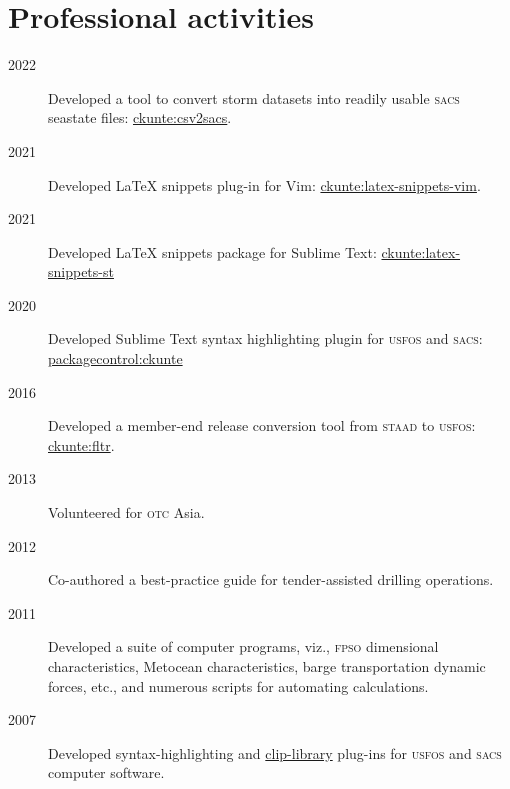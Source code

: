 \section*{Professional activities} %
\label{sec:prof_activities}

\begin{description}
\item[2022]Developed a tool to convert storm datasets into readily usable \textsc{sacs} seastate files: \href{https://github.com/ckunte/csv2sacs}{ckunte:csv2sacs}.

\item[2021]Developed {\LaTeX} snippets plug-in for Vim: \href{https://github.com/ckunte/latex-snippets-vim}{ckunte:latex-snippets-vim}.

\item[2021]Developed {\LaTeX} snippets package for Sublime Text: \href{https://github.com/ckunte/latex-snippets-st}{ckunte:latex-snippets-st}

\item[2020]Developed Sublime Text syntax highlighting plugin for \textsc{usfos} and \textsc{sacs}: \href{https://packagecontrol.io/browse/authors/ckunte}{packagecontrol:ckunte}

\item[2016]Developed a member-end release conversion tool from \textsc{staad} to \textsc{usfos}: \href{https://gist.github.com/ckunte/98fc79713b8d111b0aa6fec792b194b3}{ckunte:fltr}.

\item[2013]Volunteered for \textsc{otc} Asia.

\item[2012]Co-authored a best-practice guide for tender-assisted drilling operations.

\item[2011]Developed a suite of computer programs, viz., \textsc{fpso} dimensional characteristics, Metocean characteristics, barge transportation dynamic forces, etc., and numerous scripts for automating calculations.


\item[2007]Developed syntax-highlighting and \href{https://www.textpad.com/addons/cliplibs}{clip-library} plug-ins for \textsc{usfos} and \textsc{sacs} computer software.

\end{description}


